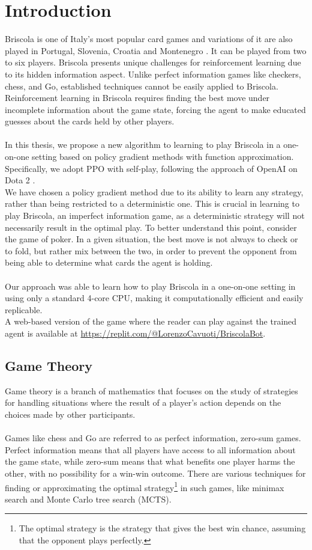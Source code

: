 \chapter{Introduction}
Briscola is one of Italy's most popular card games and variations of it are also played in Portugal, Slovenia, Croatia and Montenegro \cite{briscola-wikipedia}. It can be played from two to six players. Briscola presents unique challenges for reinforcement learning due to its hidden information aspect. Unlike perfect information games like checkers, chess, and Go, established techniques cannot be easily applied to Briscola. Reinforcement learning in Briscola requires finding the best move under incomplete information about the game state, forcing the agent to make educated guesses about the cards held by other players.\\\\
In this thesis, we propose a new algorithm to learning to play Briscola in a one-on-one setting based on policy gradient methods with function approximation. Specifically, we adopt PPO with self-play, following the approach of OpenAI on Dota 2 \cite{open-ai-five}.\\
We have chosen a policy gradient method due to its ability to learn any strategy, rather than being restricted to a deterministic one. This is crucial in learning to play Briscola, an imperfect information game, as a deterministic strategy will not necessarily result in the optimal play. To better understand this point, consider the game of poker. In a given situation, the best move is not always to check or to fold, but rather mix between the two, in order to prevent the opponent from being able to determine what cards the agent is holding.\\\\
Our approach was able to learn how to play Briscola in a one-on-one setting in using only a standard 4-core CPU, making it computationally efficient and easily replicable.\\
A web-based version of the game where the reader can play against the trained agent is available at \url{https://replit.com/@LorenzoCavuoti/BriscolaBot}.

\section{Game Theory}
Game theory is a branch of mathematics that focuses on the study of strategies for handling situations where the result of a player's action depends on the choices made by other participants.\\\\
Games like chess and Go are referred to as perfect information, zero-sum games. Perfect information means that all players have access to all information about the game state, while zero-sum means that what benefits one player harms the other, with no possibility for a win-win outcome. There are various techniques for finding or approximating the optimal strategy\footnote{The optimal strategy is the strategy that gives the best win chance, assuming that the opponent plays perfectly.} in such games, like minimax search and Monte Carlo tree search (MCTS).

